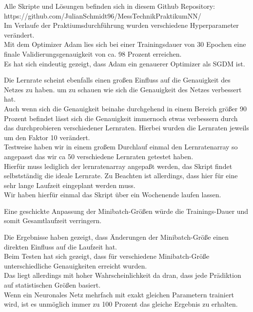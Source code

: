 \documentclass[8pt,a4paper]{article}
\begin{document}
Alle Skripte und Lösungen befinden sich in diesem Github Repository:\\
https://github.com/JulianSchmidt96/MessTechnikPraktikumNN/\\

Im Verlaufe der Praktiumsdurchführung wurden verschiedene Hyperparameter verändert.\\

Mit dem Optimizer Adam lies sich bei einer Trainingsdauer von 30 Epochen eine finale Validierungsgenauigkeit von ca. 98 Prozent erreichen.
\\
Es hat sich eindeutig gezeigt, dass Adam ein genauerer Optimizer als SGDM ist.

Die Lernrate scheint ebenfalls einen großen Einfluss auf die Genauigkeit des Netzes zu haben. um zu schauen wie sich die Genauigkeit des Netzes verbessert hat.\\

Auch wenn sich die Genauigkeit beinahe durchgehend in einem Bereich größer 90 Prozent befindet lässt sich die Genauigkeit immernoch etwas verbessern durch das durchprobieren verschiedener Lernraten.
Hierbei wurden die Lernraten jeweils um den Faktor 10 verändert.\\

Testweise haben wir in einem großem Durchlauf einmal den Lernratenarray so angepasst das wir ca 50 verschiedene Lernraten getestet haben.\\
Hierfür muss lediglich der lernratenarray angepaßt werden, das Skript findet selbstständig die ideale Lernrate.
Zu Beachten ist allerdings, dass hier für eine sehr lange Laufzeit eingeplant werden muss.\\

Wir haben hierfür einmal das Skript über ein Wochenende laufen lassen.

Eine geschickte Anpassung der Minibatch-Größen würde die Trainings-Dauer und somit Gesamtlaufzeit verringern.

Die Ergebnisse haben gezeigt, dass Änderungen der Minibatch-Größe einen direkten Einfluss auf die Laufzeit hat.\\
Beim Testen hat sich gezeigt, dass für verschiedene Minibatch-Größe unterschiedliche Genauigkeiten erreicht wurden.\\
Das liegt allerdings mit hoher Wahrscheinlichkeit da dran, dass jede Prädiktion auf statistischen Größen basiert.\\
Wenn ein Neuronales Netz mehrfach mit exakt gleichen Parametern trainiert wird, ist es  unmöglich immer zu 100 Prozent das gleiche Ergebnis zu erhalten.
\\
\end{document}
